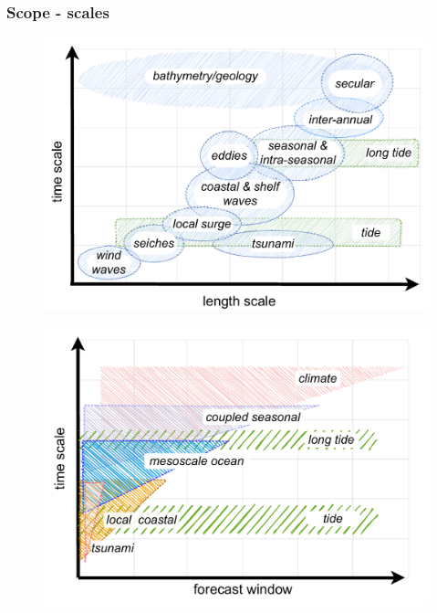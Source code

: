 \begin{frame}
\frametitle{Scope - scales}
\begin{minipage}{0.45\textwidth}
    \begin{figure}      
    \includegraphics[width=\textwidth]{figures/diagrams/scales_time_length.pdf}
    \end{figure}
\end{minipage}
\hfill
\begin{minipage}{0.45\textwidth}
    \begin{figure}      
     \includegraphics[width=\textwidth]{figures/diagrams/scales.pdf}
    \end{figure} 
\end{minipage}
\end{frame}

